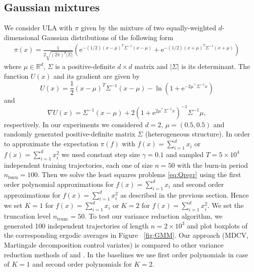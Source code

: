 \documentclass[bj]{imsart}
\def\rset{\mathbb{R}}
\def\rme{\mathrm{e}}
\def\rset{\mathbb{R}}
\def\NtrainPath{T}
\begin{document}
\subsection{Gaussian mixtures}
 We consider  ULA with $\pi$  given by the mixture of two equally-weighted $d$-dimensional Gaussian distributions of the following form
\begin{eqnarray}
\label{eq:gmm}
\pi(x) = \frac{1}{2\sqrt{(2\pi)^{d}|\Sigma|}} \left( \rme^{-(1/2)(x-\mu)^T\Sigma^{-1}(x-\mu)} + \rme^{-(1/2)(x+\mu)^T\Sigma^{-1}(x+\mu)}\right)
\end{eqnarray}
where  $\mu \in \rset^d$, $\Sigma$ is a positive-definite $d \times d$ matrix and $|\Sigma|$ is its determinant. The function $U(x)$ and its gradient are given by
\[
U(x) = \frac{1}{2}(x-\mu)^T\Sigma^{-1}(x-\mu) - \ln{\left(1 + \rme^{-2\mu^\top \Sigma^{-1}x}\right)}
\]
and
\[
\nabla U(x) = \Sigma^{-1}(x-\mu) +2 \left(1 + \rme^{2 \mu^\top\Sigma^{-1} x}\right)^{-1} \Sigma^{-1}\mu ,
\]
respectively.
In our experiments we considered $d = 2$, $\mu = \left(0.5,0.5\right)$ and randomly generated positive-definite matrix $\Sigma$ (heterogeneous structure). In order to approximate the expectation \(\pi(f)\) with \(f(x)=\sum_{i=1}^d x_i\) or \(f(x) = \sum_{i=1}^d x^2_i\) we used constant step size $\gamma=0.1$ and sampled $\NtrainPath = 5 \times 10^4$ independent training trajectories, each one of size $n = 50$ with the burn-in period $n_{\text{burn}} = 100$. Then we solve the least squares  problems \eqref{eq:Qregr} using the first order polynomial approximations for $f(x)=\sum_{i=1}^d x_i$ and second order approximations for $f(x) = \sum_{i=1}^d x^2_i$ as described in the previous section. Hence we set $K = 1$ for $f(x)=\sum_{i=1}^d x_i$ or $K = 2$ for $f(x) = \sum_{i=1}^d x^2_i$. We set the truncation level \(n_{\mathrm{trunc}} = 50\). To test our variance reduction algorithm, we generated 100 independent trajectories of length $n = 2 \times 10^3$ and plot boxplots of the corresponding ergodic averages in Figure ~\ref{fig:GMM}. Our approach (MDCV, Martingale decomposition control variates) is compared to other variance reduction methods of \cite{mira2013zero} and \cite{belomestny2019esvm}. In the baselines we use first order polynomials in case of $K=1$ and second order polynomials for $K = 2$.
\par
\end{document}
